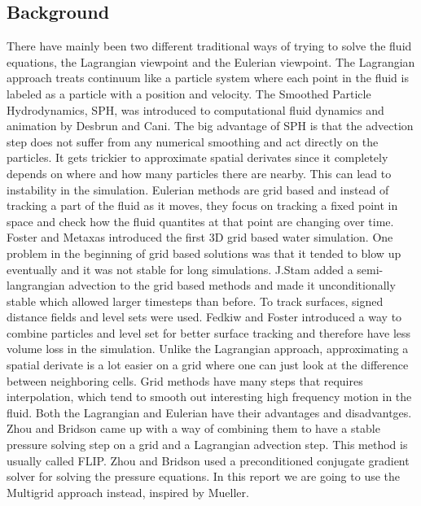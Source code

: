 \subsection{Background}

There have mainly been two different traditional ways of trying to solve the fluid equations, the Lagrangian viewpoint and the Eulerian viewpoint. The Lagrangian approach treats continuum like a particle system where each point in the fluid is labeled as a particle with a position and velocity. The Smoothed Particle Hydrodynamics\cite{sph}, SPH, was introduced to computational fluid dynamics and animation by Desbrun and Cani\cite{desbrun}. The big advantage of SPH is that the advection step does not suffer from any numerical smoothing and act directly on the particles. It gets trickier to approximate spatial derivates since it completely depends on where and how many particles there are nearby. This can lead to instability in the simulation. Eulerian methods are grid based and instead of tracking a part of the fluid as it moves, they focus on tracking a fixed point in space and check how the fluid quantites at that point are changing over time. Foster and Metaxas\cite{metaxas} introduced the first 3D grid based water simulation. One problem in the beginning of grid based solutions was that it tended to blow up eventually and it was not stable for long simulations. J.Stam\cite{stam} added a semi-langrangian advection to the grid based methods and made it unconditionally stable which allowed larger timesteps than before. To track surfaces, signed distance fields and level sets were used. Fedkiw and Foster\cite{fosterfed} introduced a way to combine particles and level set for better surface tracking and therefore have less volume loss in the simulation. Unlike the Lagrangian approach, approximating a spatial derivate is a lot easier on a grid where one can just look at the difference between neighboring cells. Grid methods have many steps that requires interpolation, which tend to smooth out interesting high frequency motion in the fluid.
\newline
\newline
Both the Lagrangian and Eulerian have their advantages and disadvantges. Zhou and Bridson\cite{zhu} came up with a way of combining them to have a stable pressure solving step on a grid and a Lagrangian advection step. This method is usually called FLIP. Zhou and Bridson used a preconditioned conjugate gradient solver for solving the pressure equations. In this report we are going to use the Multigrid approach instead, inspired by Mueller\cite{mueller}.
